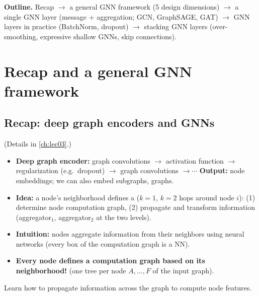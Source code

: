 \label{ch:lec04}


\textbf{Outline.} Recap $\to$ a general GNN framework (5 design dimensions)
$\to$ a single GNN layer (message + aggregation; GCN, GraphSAGE, GAT) $\to$ GNN
layers in practice (BatchNorm, dropout) $\to$ stacking GNN layers
(over-smoothing, expressive shallow GNNs, skip connections).

\section{Recap and a general GNN framework}\label{sec:lec04-framework}

\subsection{Recap: deep graph encoders and GNNs}\label{sec:lec04-recap}

(Details in \cref{ch:lec03}.)
\begin{itemize}
  \item \textbf{Deep graph encoder:} graph convolutions $\to$ activation
    function $\to$ regularization (e.g.\ dropout) $\to$ graph convolutions
    $\to\cdots$ \textbf{Output:} node embeddings; we can also embed subgraphs,
    graphs.
  \item \textbf{Idea:} a node's neighborhood defines a 
    ($k=1$, $k=2$ hops around node $i$): (1) determine node computation graph,
    (2) propagate and transform information (aggregator$_1$, aggregator$_2$ at
    the two levels).
  \item \textbf{Intuition:} nodes aggregate information from their neighbors
    using neural networks (every box of the computation graph is a NN).
  \item \textbf{Every node defines a computation graph based on its
    neighborhood!} (one tree per node $A,\dots,F$ of the input graph).
\end{itemize}
\begin{keyidea}
  Learn how to propagate information across the graph to compute node features.
\end{keyidea}

